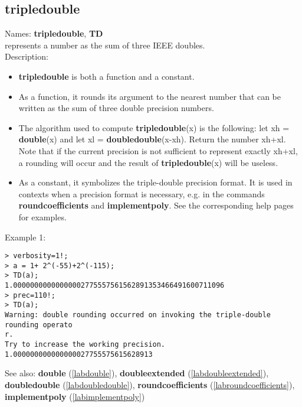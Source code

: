 \subsection{tripledouble}
\label{labtripledouble}
\noindent Names: \textbf{tripledouble}, \textbf{TD}\\
represents a number as the sum of three IEEE doubles.\\

\noindent Description: \begin{itemize}

\item \textbf{tripledouble} is both a function and a constant.

\item As a function, it rounds its argument to the nearest number that can be written
   as the sum of three double precision numbers.

\item The algorithm used to compute \textbf{tripledouble}(x) is the following: let xh = \textbf{double}(x)
   and let xl = \textbf{doubledouble}(x-xh). Return the number xh+xl. Note that if the
   current precision is not sufficient to represent exactly xh+xl, a rounding will
   occur and the result of \textbf{tripledouble}(x) will be useless.

\item As a constant, it symbolizes the triple-double precision format. It is used in 
   contexts when a precision format is necessary, e.g. in the commands 
   \textbf{roundcoefficients} and \textbf{implementpoly}.
   See the corresponding help pages for examples.
\end{itemize}
\noindent Example 1: 
\begin{center}\begin{minipage}{15cm}\begin{Verbatim}[frame=single]
> verbosity=1!;
> a = 1+ 2^(-55)+2^(-115);
> TD(a);
1.00000000000000002775557561562891353466491600711096
> prec=110!;
> TD(a);
Warning: double rounding occurred on invoking the triple-double rounding operato
r.
Try to increase the working precision.
1.000000000000000027755575615628913
\end{Verbatim}
\end{minipage}\end{center}
See also: \textbf{double} (\ref{labdouble}), \textbf{doubleextended} (\ref{labdoubleextended}), \textbf{doubledouble} (\ref{labdoubledouble}), \textbf{roundcoefficients} (\ref{labroundcoefficients}), \textbf{implementpoly} (\ref{labimplementpoly})
